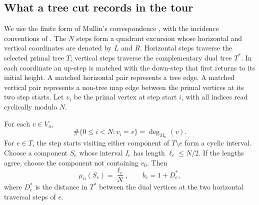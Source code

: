 \subsection{What a tree cut records in the tour}

We use the finite form of Mullin's correspondence \cite{Mullin}, with
the incidence conventions of \cite[Section~``Independent-walk encoding
and local quantum surfaces'']{MetricMaps}.  The $N$ steps form a
quadrant excursion whose horizontal and vertical coordinates are
denoted by $L$ and $R$.  Horizontal steps traverse the selected
primal tree $T$; vertical steps traverse the complementary dual tree
$T^*$.  In each coordinate an up-step is matched with the down-step
that first returns to its initial height.  A matched horizontal pair
represents a tree edge.  A matched vertical pair represents a
non-tree map edge between the primal vertices at its two step starts.
Let $v_i$ be the primal vertex at step start $i$, with all indices
read cyclically modulo $N$.

\begin{lemma}
\label{gr:tour-cut}
For each $v\in V_n$,
\begin{equation}\label{gr:tour-degree}
 \#\{0\leq i<N:v_i=v\}=\deg_{M_n}(v).
\end{equation}
For $e\in T$, the step starts visiting either component of
$T\setminus e$ form a cyclic interval.  Choose a component $S_e$
whose interval $I_e$ has length $\ell_e\leq N/2$.  If the lengths
agree, choose the component not containing $v_0$.  Then
\begin{equation}\label{gr:tour-cut-identities}
 \mu_n(S_e)=\frac{\ell_e}{N},
 \qquad b_e=1+D_e^*,
\end{equation}
where $D_e^*$ is the distance in $T^*$ between the dual vertices at
the two horizontal traversal steps of $e$.
\end{lemma}

